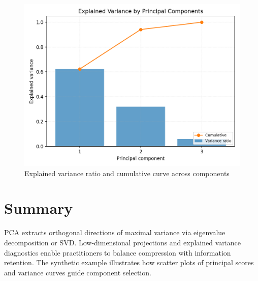 ﻿\documentclass[12pt]{article}
\begin{document}
\begin{figure}[H]
  \centering
  \includegraphics[width=0.8\linewidth]{pca_explained_variance.png}
  \caption{Explained variance ratio and cumulative curve across components}
  \label{fig:pca_explained_variance}
\end{figure}

\FloatBarrier
\section{Summary}
PCA extracts orthogonal directions of maximal variance via eigenvalue decomposition or SVD. Low-dimensional projections and explained variance diagnostics enable practitioners to balance compression with information retention. The synthetic example illustrates how scatter plots of principal scores and variance curves guide component selection.
\end{document}
